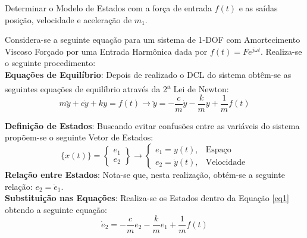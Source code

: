 \documentclass{article}
\begin{document}
\begin{exercise}\label{ex1}
    Determinar o Modelo de Estados com a força de entrada $f(t)$ e as saídas posição, velocidade e aceleração de $m_1$.
\end{exercise}
\begin{resolution}
    Considera-se a seguinte equação para um sistema de 1-DOF com Amortecimento Viscoso Forçado por uma Entrada Harmônica dada por $f(t) = F e^{j\omega t}$. Realiza-se o seguinte procedimento:\\

    \textbf{Equações de Equilíbrio}: Depois de realizado o DCL do sistema obtêm-se as seguintes equações de equilíbrio através da 2\textsuperscript{a} Lei de Newton:
    \begin{equation}\label{eq1}
        m\ddot{y} + c\dot{y} + k y = f(t)
        \to
        \ddot{y} = -\frac{c}{m} \dot{y} -\frac{k}{m} y +\frac{1}{m}f(t)
    \end{equation}

    \textbf{Definição de Estados}: Buscando evitar confusões entre as variáveis do sistema propõem-se o seguinte Vetor de Estados:
    \begin{equation*}
        \lbrace x(t) \rbrace = \begin{Bmatrix} e_1\\ e_2 \end{Bmatrix} 
        \to \begin{cases} e_1 = y(t), &\text{Espaço}\\ e_2 = \dot{y}(t),&\text{Velocidade} \end{cases}
    \end{equation*}
    \textbf{Relação entre Estados}: Nota-se que, nesta realização, obtém-se a seguinte relação: $e_2 = \dot{e}_1$.\\

    \textbf{Substituição nas Equações}: Realiza-se os Estados dentro da Equação \ref{eq1} obtendo a seguinte equação:
    \begin{equation*}
        \dot{e}_2 = -\frac{c}{m} e_2 -\frac{k}{m} e_1 +\frac{1}{m}f(t)
    \end{equation*}


\end{resolution}
\end{document}
